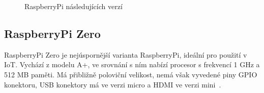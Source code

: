 \begin{figure}[!ht]
    \centering
			\hspace*{5mm}
			\hspace*{5mm}
		\caption{RaspberryPi následujících verzí}
		\vspace{-20pt}	
\end{figure}
	
\subsection{RaspberryPi Zero}
		RaspberryPi Zero je nejúspornější varianta RaspberryPi, ideální pro použití v IoT. Vychází z modelu A+, ve srovnání s ním nabízí procesor s frekvencí 1 GHz a 512 MB paměti. Má přibližně poloviční velikost, nemá však vyvedené piny GPIO konektoru, USB konektory má ve verzi micro a HDMI ve verzi mini~\cite{RaspiZero}.





